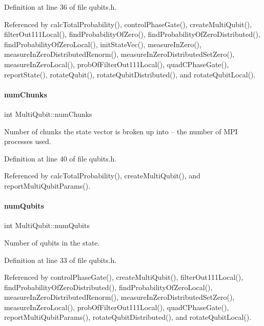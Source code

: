 Definition at line 36 of file qubits.\+h.



Referenced by calc\+Total\+Probability(), control\+Phase\+Gate(), create\+Multi\+Qubit(), filter\+Out111\+Local(), find\+Probability\+Of\+Zero(), find\+Probability\+Of\+Zero\+Distributed(), find\+Probability\+Of\+Zero\+Local(), init\+State\+Vec(), measure\+In\+Zero(), measure\+In\+Zero\+Distributed\+Renorm(), measure\+In\+Zero\+Distributed\+Set\+Zero(), measure\+In\+Zero\+Local(), prob\+Of\+Filter\+Out111\+Local(), quad\+C\+Phase\+Gate(), report\+State(), rotate\+Qubit(), rotate\+Qubit\+Distributed(), and rotate\+Qubit\+Local().

\mbox{\label{structMultiQubit_acd43f2f57991709c9e94f73662c972b2}} 
\paragraph{\texorpdfstring{num\+Chunks}{numChunks}}
{\footnotesize\ttfamily int Multi\+Qubit\+::num\+Chunks}



Number of chunks the state vector is broken up into -- the number of M\+PI processes used. 



Definition at line 40 of file qubits.\+h.



Referenced by calc\+Total\+Probability(), create\+Multi\+Qubit(), and report\+Multi\+Qubit\+Params().

\mbox{\label{structMultiQubit_ab5b9795bdc6fb5855e1974dcbbaeb36f}} 
\paragraph{\texorpdfstring{num\+Qubits}{numQubits}}
{\footnotesize\ttfamily int Multi\+Qubit\+::num\+Qubits}



Number of qubits in the state. 



Definition at line 33 of file qubits.\+h.



Referenced by control\+Phase\+Gate(), create\+Multi\+Qubit(), filter\+Out111\+Local(), find\+Probability\+Of\+Zero\+Distributed(), find\+Probability\+Of\+Zero\+Local(), measure\+In\+Zero\+Distributed\+Renorm(), measure\+In\+Zero\+Distributed\+Set\+Zero(), measure\+In\+Zero\+Local(), prob\+Of\+Filter\+Out111\+Local(), quad\+C\+Phase\+Gate(), report\+Multi\+Qubit\+Params(), rotate\+Qubit\+Distributed(), and rotate\+Qubit\+Local().

